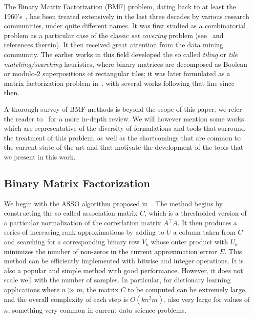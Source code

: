 \documentclass[twocolumn]{IEEEtran}
\theoremstyle{definition}
\def\transp{^\intercal}
\begin{document}
%
The Binary Matrix Factorization (BMF) problem, dating back to at least the 1960's~\cite{bmf-oldest}, has been treated extensively in the last three decades by various research communities, under quite different names. It was first studied as a combinatorial problem as a particular case of the classic \emph{set covering} problem (see~\cite{monson95} and references therein). It then received great attention from the data mining community. The earlier works in this field developed the so called \emph{tiling} or \emph{tile matching/searching} heuristics, where binary matrices are decomposed as Boolean or modulo-2 superpositions of rectangular tiles\cite{proximus,tiling}; it was later formulated as a matrix factorization problem in~\cite{asso}, with several works following that line since then.

A thorough survey of BMF methods is beyond the scope of this paper; we refer the reader to~\cite{bmf-comp} for a more in-depth review. We will however mention some works which are representative of the diversity of formulations and tools that surround the treatment of this problem, as well as the shortcomings that are common to the current state of the art and that motivate the development of the tools that we present in this work.

\subsection{Binary Matrix Factorization}

We begin with the ASSO algorithm proposed in~\cite{asso}. The  method  begins by constructing the so called association matrix $C$, which is a thresholded version of a particular normalization of the correrlation matrix $A{\transp}A$. It then produces a series of increasing rank approximations by adding to $U$ a column taken from $C$ and searching for a corresponding binary row $V_k$ whose outer product with $U_k$ minimizes the number of non-zeros in the current approximation errror $E$. This method can be efficiently implemented with bitwise and integer operations. It is also a popular and simple method with good performance. However, it does not scale well with the number of samples. In particular, for dictionary learning applications where $n \gg m$, the matrix $C$ to be computed can be extremely large, and the overall complexity of each step is $O(kn^2m)$, also very large for values of $n$, something very common in current data science problems.
\end{document}
